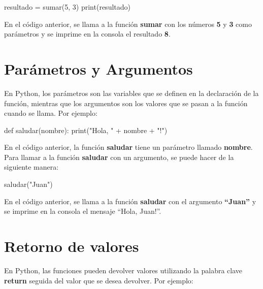 \documentclass[
  a4paper,
  DIV=11,
  numbers=noendperiod,
  onepage,
  openany]{scrreprt}
\newenvironment{Shaded}{\begin{snugshade}}{\end{snugshade}}
\newcommand{\BuiltInTok}[1]{\textcolor[rgb]{0.00,0.23,0.31}{#1}}
\newcommand{\DecValTok}[1]{\textcolor[rgb]{0.68,0.00,0.00}{#1}}
\newcommand{\KeywordTok}[1]{\textcolor[rgb]{0.00,0.23,0.31}{#1}}
\newcommand{\NormalTok}[1]{\textcolor[rgb]{0.00,0.23,0.31}{#1}}
\newcommand{\OperatorTok}[1]{\textcolor[rgb]{0.37,0.37,0.37}{#1}}
\newcommand{\StringTok}[1]{\textcolor[rgb]{0.13,0.47,0.30}{#1}}
\begin{document}
\begin{Shaded}
\begin{Highlighting}[]
\NormalTok{resultado }\OperatorTok{=}\NormalTok{ sumar(}\DecValTok{5}\NormalTok{, }\DecValTok{3}\NormalTok{)}
\BuiltInTok{print}\NormalTok{(resultado)}
\end{Highlighting}
\end{Shaded}

En el código anterior, se llama a la función \textbf{sumar} con los
números \textbf{5} y \textbf{3} como parámetros y se imprime en la
consola el resultado \textbf{8}.

\section{Parámetros y Argumentos}\label{paruxe1metros-y-argumentos}

En Python, los parámetros son las variables que se definen en la
declaración de la función, mientras que los argumentos son los valores
que se pasan a la función cuando se llama. Por ejemplo:

\begin{Shaded}
\begin{Highlighting}[]
\KeywordTok{def}\NormalTok{ saludar(nombre):}
    \BuiltInTok{print}\NormalTok{(}\StringTok{"Hola, "} \OperatorTok{+}\NormalTok{ nombre }\OperatorTok{+} \StringTok{"!"}\NormalTok{)}
\end{Highlighting}
\end{Shaded}

En el código anterior, la función \textbf{saludar} tiene un parámetro
llamado \textbf{nombre}. Para llamar a la función \textbf{saludar} con
un argumento, se puede hacer de la siguiente manera:

\begin{Shaded}
\begin{Highlighting}[]
\NormalTok{saludar(}\StringTok{"Juan"}\NormalTok{)}
\end{Highlighting}
\end{Shaded}

En el código anterior, se llama a la función \textbf{saludar} con el
argumento \textbf{``Juan''} y se imprime en la consola el mensaje
``Hola, Juan!''.

\section{Retorno de valores}\label{retorno-de-valores}

En Python, las funciones pueden devolver valores utilizando la palabra
clave \textbf{return} seguida del valor que se desea devolver. Por
ejemplo:
\end{document}
